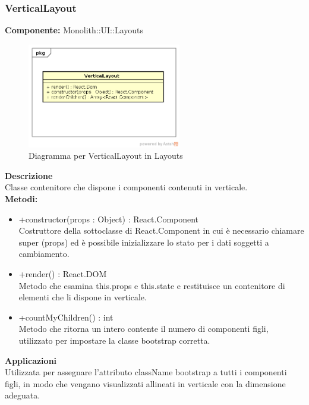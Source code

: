 \subsubsection{VerticalLayout}
\textbf{Componente:}  Monolith::UI::Layouts\\
   \FloatBarrier
   \begin{figure}[ht]
   \centering
   \includegraphics[width=0.6\textwidth]{img/single-VerticalLayout}
   \caption{{Diagramma per VerticalLayout in Layouts}}
\end{figure}
\FloatBarrier
\textbf{Descrizione}\\
Classe contenitore che dispone i componenti contenuti in verticale. \\
\textbf{Metodi:}
\begin{itemize}

\item +constructor(props : Object) : React.Component 
\\
Costruttore della sottoclasse di React.Component in cui è necessario chiamare super (props) ed è possibile inizializzare lo stato per i dati soggetti a cambiamento.

\item +render() : React.DOM 
\\
Metodo che esamina this.props e this.state e restituisce un contenitore di elementi che li dispone in verticale.

\item +countMyChildren() : int
\\
Metodo che ritorna un intero contente il numero di componenti figli, utilizzato per impostare la classe bootstrap corretta.

\end{itemize} 


\textbf{Applicazioni}\\
Utilizzata per assegnare l'attributo className bootstrap a tutti i componenti figli, in modo che vengano visualizzati allineati in verticale con la dimensione adeguata. 


